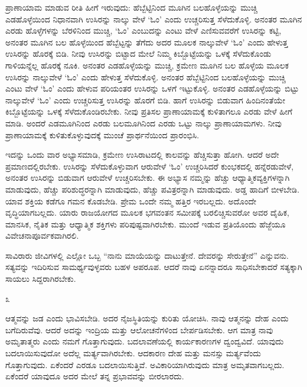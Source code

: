 ಪ್ರಾಣಾಯಾಮ ಮಾಡುವ ರೀತಿ ಹೀಗೆ ಇರುವುದು: ಹೆಬ್ಬೆಟ್ಟಿನಿಂದ ಮೂಗಿನ ಬಲಹೊಳ್ಳೆಯನ್ನು ಮುಚ್ಚಿ ಎಡಹೊಳ್ಳೆಯಿಂದ ನಿಧಾನವಾಗಿ ಉಸಿರನ್ನು ನಾಲ್ಕು ವೇಳೆ `ಓಂ' ಎಂದು ಉಚ್ಚರಿಸುತ್ತ ಸೆಳೆದುಕೊಳ್ಳಿ. ಅನಂತರ ಮೂಗಿನ ಎರಡು ಹೊಳ್ಳೆಗಳನ್ನು ಬೆರಳಿನಿಂದ ಮುಚ್ಚಿ, `ಓಂ' ಎಂಬುದನ್ನು ಎಂಟು ವೇಳೆ ಎಣಿಸುವವರೆಗೆ ಉಸಿರನ್ನು ಕಟ್ಟಿ, ಅನಂತರ ಮೂಗಿನ ಬಲ ಹೊಳ್ಳೆಯಿಂದ ಹೆಬ್ಬೆಟ್ಟನ್ನು ತೆಗೆದು ಅದರ ಮೂಲಕ ನಾಲ್ಕುವೇಳೆ `ಓಂ' ಎಂದು ಹೇಳುತ್ತ ಉಸಿರನ್ನು ಹೊರಕ್ಕೆ ಬಿಡಿ. ನೀವು ಉಸಿರನ್ನು ಬಿಟ್ಟಾದ ಮೇಲೆ ನಿಮ್ಮ ಕಿಬ್ಬೊಟ್ಟೆಯನ್ನು ಒಳಕ್ಕೆ ಸೆಳೆದುಕೊಂಡು ಗಾಳಿಯನ್ನೆಲ್ಲ ಹೊರಕ್ಕೆ ನೂಕಿ. ಅನಂತರ ಎಡಹೊಳ್ಳೆಯನ್ನು ಮುಚ್ಚಿ, ಕ್ರಮೇಣ ಮೂಗಿನ ಬಲ ಹೊಳ್ಳೆಯ ಮೂಲಕ ಉಸಿರನ್ನು ನಾಲ್ಕುವೇಳೆ `ಓಂ' ಎಂದು ಹೇಳುತ್ತ ಸೆಳೆದುಕೊಳ್ಳಿ. ಅನಂತರ ಹೆಬ್ಬೆಟ್ಟಿನಿಂದ ಬಲಹೊಳ್ಳೆಯನ್ನು ಮುಚ್ಚಿ ಎಂಟು ವೇಳೆ `ಓಂ' ಎಂದು ಹೇಳುವ ಪರಿಯಂತರ ಉಸಿರನ್ನು ಒಳಗೆ ಇಟ್ಟುಕೊಳ್ಳಿ. ಅನಂತರ ಎಡಹೊಳ್ಳೆಯನ್ನು ಬಿಟ್ಟು ನಾಲ್ಕುವೇಳೆ `ಓಂ' ಎಂದು ಉಚ್ಚರಿಸುತ್ತ ಉಸಿರನ್ನು ಹೊರಗೆ ಬಿಡಿ. ಹಾಗೆ ಉಸಿರನ್ನು ಬಿಡುವಾಗ ಹಿಂದಿನಂತೆಯೇ ಕಿಬ್ಬೊಟ್ಟೆಯನ್ನು ಒಳಕ್ಕೆ ಸೆಳೆದುಕೊಂಡಿರಬೇಕು. ನೀವು ಪ್ರತಿಸಲ ಪ್ರಾಣಾಯಾಮಕ್ಕೆ ಕುಳಿತಾಗಲೂ ಎರಡು ವೇಳೆ ಹೀಗೆ ಮಾಡಿ. ಅಂದರೆ ಎಡಮೂಗಿನಿಂದ ಎರಡು ಬಲಮೂಗಿನಿಂದ ಎರಡು ಒಟ್ಟು ನಾಲ್ಕು ಪ್ರಾಣಾಯಾಮಗಳು. ನೀವು ಪ್ರಾಣಾಯಾಮಕ್ಕೆ ಕುಳಿತುಕೊಳ್ಳುವುದಕ್ಕೆ ಮುಂಚೆ ಪ್ರಾರ್ಥನೆಯಿಂದ ಪ್ರಾರಂಭಿಸಿ.

\vskip 2pt

ಇದನ್ನು ಒಂದು ವಾರ ಅಭ್ಯಾಸಮಾಡಿ, ಕ್ರಮೇಣ ಉಸಿರಾಟದಲ್ಲಿ ಕಾಲವನ್ನು ಹೆಚ್ಚಿಸುತ್ತಾ ಹೋಗಿ. ಆದರೆ ಅದೇ ಪ್ರಮಾಣದಲ್ಲಿರಬೇಕು. ಉಸಿರನ್ನು ಸೆಳೆದುಕೊಳ್ಳುವಾಗ ಆರುವೇಳೆ `ಓಂ' ಉಚ್ಚರಿಸಿದರೆ ಕುಂಭಕದಲ್ಲಿ ಹನ್ನೆರಡುವೇಳೆ, ಅನಂತರ ಉಸಿರನ್ನು ಬಿಡುವಾಗ ಆರುವೇಳೆ ಉಚ್ಚರಿಸಬೇಕು. ಈ ಅಭ್ಯಾಸ ನಮ್ಮನ್ನು ಹೆಚ್ಚು ಆಧ್ಯಾತ್ಮಿಕ\break ವ್ಯಕ್ತಿಗಳನ್ನಾಗಿ ಮಾಡುವುದು, ಹೆಚ್ಚು ಪರಿಶುದ್ಧರನ್ನಾಗಿ ಮಾಡುವುದು, ಹೆಚ್ಚು ಪವಿತ್ರರನ್ನಾಗಿ ಮಾಡುವುದು. ಅಡ್ಡ ಹಾದಿಗೆ ಬೀಳಬೇಡಿ. ಯಾವ ಶಕ್ತಿಯ ಕಡೆಗೂ ಗಮನ ಕೊಡಬೇಡಿ. ಪ್ರೇಮ ಒಂದೇ ನಮ್ಮ ಹತ್ತಿರ ಇರಬಲ್ಲದು. ಅದೊಂದೇ ವೃದ್ಧಿಯಾಗಬಲ್ಲದು. ಯಾರು ರಾಜಯೋಗದ ಮೂಲಕ ಭಗವಂತನ ಸಮೀಪಕ್ಕೆ ಬರಲಿಚ್ಚಿಸುವರೋ ಅವರ ದೈಹಿಕ, ಮಾನಸಿಕ, ನೈತಿಕ ಮತ್ತು ಆಧ್ಯಾತ್ಮಿಕ ಶಕ್ತಿಗಳು ಪರಿಪುಷ್ಟವಾಗಿರಬೇಕು. ಮುಂದೆ ಇಡುವ ಪ್ರತಿಯೊಂದು ಹೆಜ್ಜೆಯೂ ವಿವೇಚನಾಪೂರ್ವಕವಾಗಿರಲಿ.

\vskip 2pt

ಸಾವಿರಾರು ಜೀವಿಗಳಲ್ಲಿ ಎಲ್ಲೋ ಒಬ್ಬ “ನಾನು ಮಾಯೆಯನ್ನು ದಾಟುತ್ತೇನೆ. ದೇವರನ್ನು ಸೇರುತ್ತೇನೆ'' ಎನ್ನುವನು. ಸತ್ಯವನ್ನು ಇದಿರಿಸುವ ಸಾಮರ್ಥ್ಯವುಳ್ಳವರು ಬಹಳ ಅಪರೂಪ. ಆದರೆ ನಾವು ಏನನ್ನಾದರೂ ಸಾಧಿಸಬೇಕಾದರೆ ಸತ್ಯಕ್ಕಾಗಿ ಸಾಯಲು ಸಿದ್ದರಾಗಿರಬೇಕು.

\begin{center}
೩
\end{center}

ಆತ್ಮವನ್ನು ಜಡ ಎಂದು ಭಾವಿಸಬೇಡಿ. ಅದರ ನೈಜಸ್ಥಿತಿಯನ್ನು ಕುರಿತು ಯೋಚಿಸಿ. ನಾವು ಆತ್ಮನನ್ನು ದೇಹ ಎಂದು ಬಗೆದಿರುವೆವು. ಆದರೆ ಅದನ್ನು ಇಂದ್ರಿಯ ಮತ್ತು ಆಲೋಚನೆಗಳಿಂದ ಬೇರ್ಪಡಿಸಬೇಕು. ಆಗ ಮಾತ್ರ ನಾವು ಅಮೃತಾತ್ಮರು ಎಂದು ನಮಗೆ ಗೊತ್ತಾಗುವುದು. ಬದಲಾವಣೆಯಲ್ಲಿ ಕಾರ್ಯಕಾರಣಗಳ ದ್ವಂದ್ವವಿದೆ. ಯಾವುದು ಬದಲಾಯಿಸುವುದೋ ಅದೆಲ್ಲ ಮರ್ತ್ಯವಾಗಿರಬೇಕು. ಆದಕಾರಣ ದೇಹ ಮತ್ತು ಮನಸ್ಸು ಮರ್ತ್ಯವೆಂದು ಗೊತ್ತಾಗುವುದು. ಏಕೆಂದರೆ ಎರಡೂ ಬದಲಾಯಿಸುತ್ತಿವೆ. ಅವಿಕಾರಿಯಾಗಿರುವುದು ಮಾತ್ರ ಅಮೃತವಾಗಬಲ್ಲದು. ಏಕೆಂದರೆ ಯಾವುದೂ ಅದರ ಮೇಲೆ ತನ್ನ ಪ್ರಭಾವವನ್ನು ಬೀರಲಾರದು.

